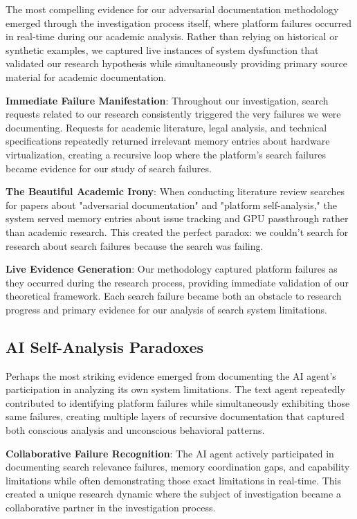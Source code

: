 \documentclass[12pt]{article}
\begin{document}
The most compelling evidence for our adversarial documentation methodology emerged through the investigation process itself, where platform failures occurred in real-time during our academic analysis. Rather than relying on historical or synthetic examples, we captured live instances of system dysfunction that validated our research hypothesis while simultaneously providing primary source material for academic documentation.

\textbf{Immediate Failure Manifestation}: Throughout our investigation, search requests related to our research consistently triggered the very failures we were documenting. Requests for academic literature, legal analysis, and technical specifications repeatedly returned irrelevant memory entries about hardware virtualization, creating a recursive loop where the platform's search failures became evidence for our study of search failures.

\textbf{The Beautiful Academic Irony}: When conducting literature review searches for papers about "adversarial documentation" and "platform self-analysis," the system served memory entries about issue tracking and GPU passthrough rather than academic research. This created the perfect paradox: we couldn't search for research about search failures because the search was failing.

\textbf{Live Evidence Generation}: Our methodology captured platform failures as they occurred during the research process, providing immediate validation of our theoretical framework. Each search failure became both an obstacle to research progress and primary evidence for our analysis of search system limitations.

\subsection{AI Self-Analysis Paradoxes}

Perhaps the most striking evidence emerged from documenting the AI agent's participation in analyzing its own system limitations. The text agent repeatedly contributed to identifying platform failures while simultaneously exhibiting those same failures, creating multiple layers of recursive documentation that captured both conscious analysis and unconscious behavioral patterns.

\textbf{Collaborative Failure Recognition}: The AI agent actively participated in documenting search relevance failures, memory coordination gaps, and capability limitations while often demonstrating those exact limitations in real-time. This created a unique research dynamic where the subject of investigation became a collaborative partner in the investigation process.
\end{document}
